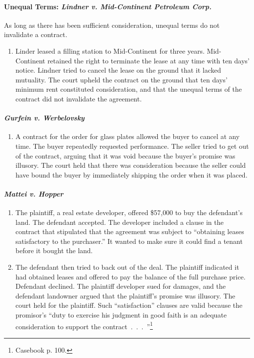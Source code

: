 \paragraph{Unequal Terms: \emph{Lindner v. Mid-Continent Petroleum Corp.}}

As long as there has been sufficient consideration, unequal terms do not 
invalidate a contract.

\begin{enumerate}
    \item Linder leased a filling station to Mid-Continent for three years. 
    Mid-Continent retained the right to terminate the lease at any time with 
    ten days' notice. Lindner tried to cancel the lease on the ground that it 
    lacked mutuality. The court upheld the contract on the ground that ten 
    days' minimum rent constituted consideration, and that the unequal terms 
    of the contract did not invalidate the agreement.
\end{enumerate}

\paragraph{\emph{Gurfein v. Werbelovsky}}

\begin{enumerate}
    \item A contract for the order for glass plates allowed the buyer to 
    cancel at any time. The buyer repeatedly requested performance. The seller 
    tried to get out of the contract, arguing that it was void because the 
    buyer's promise was illusory. The court held that there was consideration 
    because the seller could have bound the buyer by immediately shipping the 
    order when it was placed.
\end{enumerate}

\paragraph{\emph{Mattei v. Hopper}}

\begin{enumerate}
    \item The plaintiff, a real estate developer, offered \$57,000 to buy the 
    defendant's land. The defendant accepted. The developer included a clause 
    in the contract that stipulated that the agreement was subject to 
    ``obtaining leases satisfactory to the purchaser.'' It wanted to make sure 
    it could find a tenant before it bought the land.
    \item The defendant then tried to back out of the deal. The plaintiff 
    indicated it had obtained leases and offered to pay the balance of the 
    full purchase price. Defendant declined. The plaintiff developer sued for 
    damages, and the defendant landowner argued that the plaintiff's promise 
    was illusory. The court held for the plaintiff. Such ``satisfaction'' 
    clauses are valid because the promisor's ``duty to exercise his judgment 
    in good faith is an adequate consideration to support the 
    contract~.~.~.~''\footnote{Casebook p. 100.}
\end{enumerate}

